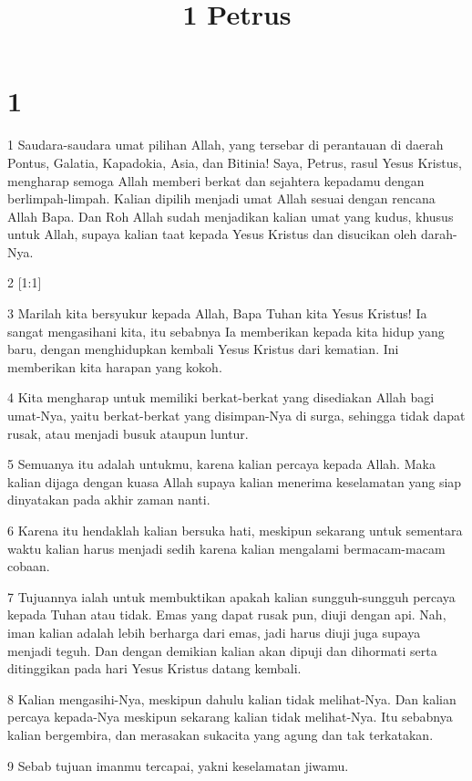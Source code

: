 

\title{1 Petrus}


\chapter{1}

\par 1 Saudara-saudara umat pilihan Allah, yang tersebar di perantauan di daerah Pontus, Galatia, Kapadokia, Asia, dan Bitinia! Saya, Petrus, rasul Yesus Kristus, mengharap semoga Allah memberi berkat dan sejahtera kepadamu dengan berlimpah-limpah. Kalian dipilih menjadi umat Allah sesuai dengan rencana Allah Bapa. Dan Roh Allah sudah menjadikan kalian umat yang kudus, khusus untuk Allah, supaya kalian taat kepada Yesus Kristus dan disucikan oleh darah-Nya.
\par 2 [1:1]
\par 3 Marilah kita bersyukur kepada Allah, Bapa Tuhan kita Yesus Kristus! Ia sangat mengasihani kita, itu sebabnya Ia memberikan kepada kita hidup yang baru, dengan menghidupkan kembali Yesus Kristus dari kematian. Ini memberikan kita harapan yang kokoh.
\par 4 Kita mengharap untuk memiliki berkat-berkat yang disediakan Allah bagi umat-Nya, yaitu berkat-berkat yang disimpan-Nya di surga, sehingga tidak dapat rusak, atau menjadi busuk ataupun luntur.
\par 5 Semuanya itu adalah untukmu, karena kalian percaya kepada Allah. Maka kalian dijaga dengan kuasa Allah supaya kalian menerima keselamatan yang siap dinyatakan pada akhir zaman nanti.
\par 6 Karena itu hendaklah kalian bersuka hati, meskipun sekarang untuk sementara waktu kalian harus menjadi sedih karena kalian mengalami bermacam-macam cobaan.
\par 7 Tujuannya ialah untuk membuktikan apakah kalian sungguh-sungguh percaya kepada Tuhan atau tidak. Emas yang dapat rusak pun, diuji dengan api. Nah, iman kalian adalah lebih berharga dari emas, jadi harus diuji juga supaya menjadi teguh. Dan dengan demikian kalian akan dipuji dan dihormati serta ditinggikan pada hari Yesus Kristus datang kembali.
\par 8 Kalian mengasihi-Nya, meskipun dahulu kalian tidak melihat-Nya. Dan kalian percaya kepada-Nya meskipun sekarang kalian tidak melihat-Nya. Itu sebabnya kalian bergembira, dan merasakan sukacita yang agung dan tak terkatakan.
\par 9 Sebab tujuan imanmu tercapai, yakni keselamatan jiwamu.
